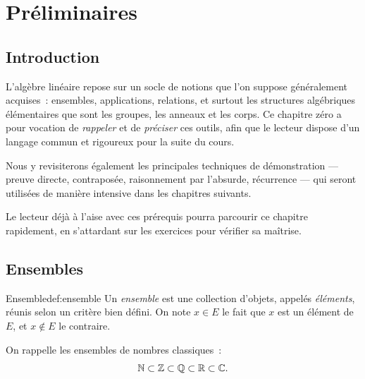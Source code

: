
\chapter{Préliminaires}\label{ch:preliminaires}

\section*{Introduction}

L'algèbre linéaire repose sur un socle de notions que l'on suppose
généralement acquises~: ensembles, applications, relations, et surtout
les structures algébriques élémentaires que sont les groupes, les anneaux
et les corps. Ce chapitre zéro a pour vocation de \emph{rappeler} et de
\emph{préciser} ces outils, afin que le lecteur dispose d'un langage
commun et rigoureux pour la suite du cours.

Nous y revisiterons également les principales techniques de démonstration
--- preuve directe, contraposée, raisonnement par l'absurde, récurrence ---
qui seront utilisées de manière intensive dans les chapitres suivants.

Le lecteur déjà à l'aise avec ces prérequis pourra parcourir ce chapitre
rapidement, en s'attardant sur les exercices pour vérifier sa maîtrise.

\section{Ensembles}\label{sec:ensembles}

\begin{definition}{Ensemble}{def:ensemble}
  Un \emph{ensemble} est une collection d'objets, appelés
  \emph{éléments}, réunis selon un critère bien défini. On note $x\in E$
  le fait que $x$ est un élément de $E$, et $x\notin E$ le contraire.
\end{definition}

On rappelle les ensembles de nombres classiques~:
\[
  {\mathbb{N}} \subset {\mathbb{Z}} \subset {\mathbb{Q}} \subset {\mathbb{R}} \subset {\mathbb{C}}.
\]

